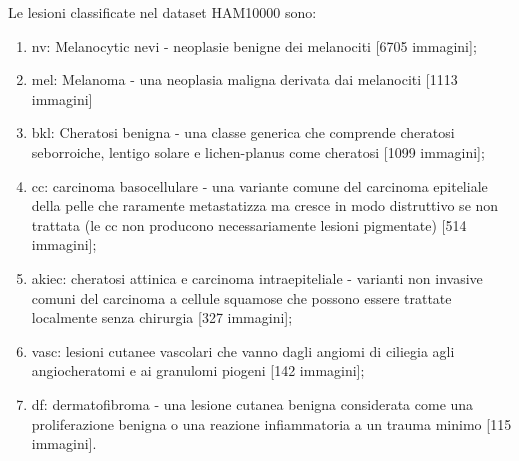 {	\newline
	Le lesioni classificate nel dataset HAM10000 sono: \cite{tschandl2018ham10000}
	\begin{enumerate}
		\item nv: Melanocytic nevi - neoplasie benigne dei melanociti [6705 immagini];
		\item mel: Melanoma - una neoplasia maligna derivata dai melanociti [1113 immagini]
		\item 	bkl: Cheratosi benigna - una classe generica che comprende cheratosi seborroiche, lentigo solare e lichen-planus come cheratosi [1099 immagini];
		\item cc: carcinoma basocellulare - una variante comune del carcinoma epiteliale della pelle che raramente metastatizza ma cresce in modo distruttivo se non trattata (le cc non producono necessariamente lesioni pigmentate) [514 immagini];
		\item akiec: cheratosi attinica e carcinoma intraepiteliale - varianti non invasive comuni del carcinoma a cellule squamose che possono essere trattate localmente senza chirurgia [327 immagini];
		\item vasc: lesioni cutanee vascolari che vanno dagli angiomi di ciliegia agli angiocheratomi e ai granulomi piogeni [142 immagini];
		\item df: dermatofibroma - una lesione cutanea benigna considerata come una proliferazione benigna o una reazione infiammatoria a un trauma minimo [115 immagini].
	\end{enumerate}
	
}
